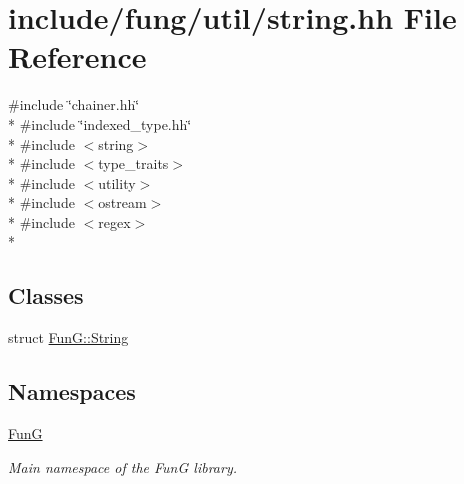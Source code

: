 \hypertarget{string_8hh}{\section{include/fung/util/string.hh File Reference}
\label{string_8hh}
}
{\ttfamily \#include \char`\"{}chainer.\-hh\char`\"{}}\\*
{\ttfamily \#include \char`\"{}indexed\-\_\-type.\-hh\char`\"{}}\\*
{\ttfamily \#include $<$string$>$}\\*
{\ttfamily \#include $<$type\-\_\-traits$>$}\\*
{\ttfamily \#include $<$utility$>$}\\*
{\ttfamily \#include $<$ostream$>$}\\*
{\ttfamily \#include $<$regex$>$}\\*
\subsection*{Classes}
\begin{DoxyCompactItemize}
\item 
struct \hyperlink{structFunG_1_1String}{Fun\-G\-::\-String}
\end{DoxyCompactItemize}
\subsection*{Namespaces}
\begin{DoxyCompactItemize}
\item 
\hyperlink{namespaceFunG}{Fun\-G}
\begin{DoxyCompactList}\small\item\em Main namespace of the Fun\-G library. \end{DoxyCompactList}\end{DoxyCompactItemize}
